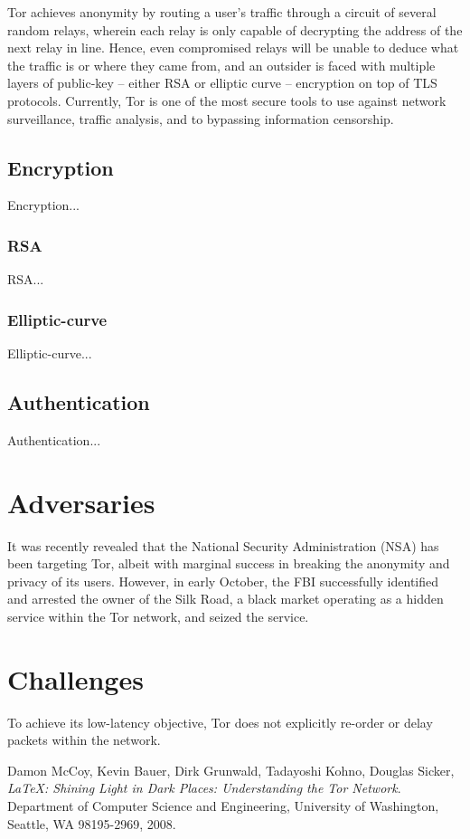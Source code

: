 \documentclass[journal]{IEEEtran}
\begin{document}
Tor achieves anonymity by routing a user's traffic through a circuit of several random relays, wherein each relay is only capable of decrypting the address of the next relay in line. Hence, even compromised relays will be unable to deduce what the traffic is or where they came from, and an outsider is faced with multiple layers of public-key -- either RSA or elliptic curve -- encryption on top of TLS protocols. Currently, Tor is one of the most secure tools to use against network surveillance, traffic analysis, and to bypassing information censorship.

\subsection{Encryption}

Encryption...

\subsubsection{RSA}

RSA...

\subsubsection{Elliptic-curve}

Elliptic-curve...

\subsection{Authentication}

Authentication...

\section{Adversaries}

It was recently revealed that the National Security Administration (NSA) has been targeting Tor, albeit with marginal success in breaking the anonymity and privacy of its users. However, in early October, the FBI successfully identified and arrested the owner of the Silk Road, a black market operating as a hidden service within the Tor network, and seized the service.

\section{Challenges}

To achieve its low-latency objective, Tor does not explicitly re-order or delay packets within the network.\cite{McCoy2008}

\begin{thebibliography}{9}

  Damon McCoy, Kevin Bauer, Dirk Grunwald, Tadayoshi Kohno, Douglas Sicker,
  \emph{\LaTeX: Shining Light in Dark Places: Understanding the Tor Network}.
  Department of Computer Science and Engineering,
  University of Washington, Seattle, WA 98195-2969,
  2008.

\end{thebibliography}
\end{document}
